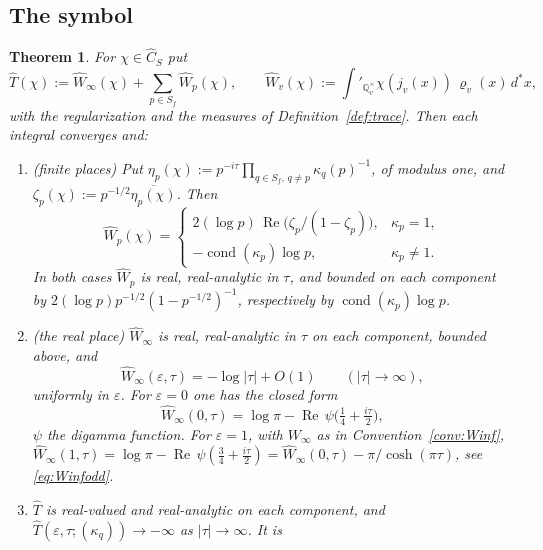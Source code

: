 \documentclass[11pt]{amsart}
\newtheorem{theorem}{Theorem}[section]
\theoremstyle{definition}
\theoremstyle{remark}
\newcommand{\Q}{\mathbb Q}
\newcommand{\dstar}{\,d^{*}}
\newcommand{\Rel}{\operatorname{Re}}
\newcommand{\Th}{\widehat{T}}
\newcommand{\Wh}{\widehat{W}}
\newcommand{\Ch}{\widehat{C}_S}
\newcommand{\cond}{\operatorname{cond}}
\begin{document}
\subsection{The symbol}

\begin{theorem}\label{thm:symbol}
For $\chi\in\Ch$ put
\begin{equation}\label{eq:symboldef}
\Th(\chi):=\Wh_{\infty}(\chi)+\sum_{p\in S_f}\Wh_p(\chi),\qquad
\Wh_v(\chi):=\int'_{\Q_v^{\times}}\chi(j_v(x))\,\varrho_v(x)\dstar x,
\end{equation}
with the regularization and the measures of Definition~\ref{def:trace}.  Then
each integral converges and:
\begin{enumerate}
\item[(a)] \emph{(finite places)}  Put
$\eta_p(\chi):=p^{-i\tau}\prod_{q\in S_f,\,q\ne p}\kappa_q(p)^{-1}$, of modulus
one, and $\zeta_p(\chi):=p^{-1/2}\overline{\eta_p(\chi)}$.  Then
\begin{equation}\label{eq:Wphat}
\Wh_p(\chi)=
\begin{cases}
2(\log p)\,\Rel\bigl(\zeta_p/(1-\zeta_p)\bigr), & \kappa_p=1,\\[2pt]
-\cond(\kappa_p)\log p, & \kappa_p\neq1 .
\end{cases}
\end{equation}
In both cases $\Wh_p$ is real, real-analytic in $\tau$, and bounded on each
component by $2(\log p)p^{-1/2}(1-p^{-1/2})^{-1}$, respectively by
$\cond(\kappa_p)\log p$.
\item[(b)] \emph{(the real place)}  $\Wh_{\infty}$ is real, real-analytic in
$\tau$ on each component, bounded above, and
\begin{equation}\label{eq:Winfhat}
\Wh_{\infty}(\varepsilon,\tau)=-\log|\tau|+O(1)\qquad(|\tau|\to\infty),
\end{equation}
uniformly in $\varepsilon$.  For $\varepsilon=0$ one has the closed form
\begin{equation}\label{eq:Winfclosed}
\Wh_{\infty}(0,\tau)=\log\pi-\Rel\,\psi\bigl(\tfrac14+\tfrac{i\tau}{2}\bigr),
\end{equation}
$\psi$ the digamma function.  For $\varepsilon=1$, with $W_{\infty}$ as in
Convention~\ref{conv:Winf}, $\Wh_{\infty}(1,\tau)=\log\pi-\Rel\,\psi(\tfrac34+
\tfrac{i\tau}2)=\Wh_{\infty}(0,\tau)-\pi/\cosh(\pi\tau)$, see
\eqref{eq:Winfodd}.
\item[(c)] $\Th$ is real-valued and real-analytic on each component, and
$\Th(\varepsilon,\tau;(\kappa_q))\to-\infty$ as $|\tau|\to\infty$.  It is

\end{enumerate}
\end{theorem}
\end{document}
